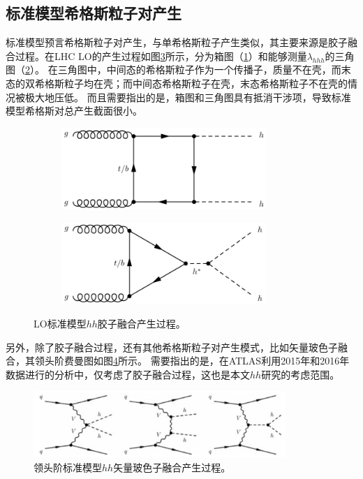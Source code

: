 \subsection{标准模型希格斯粒子对产生}
标准模型预言希格斯粒子对产生，与单希格斯粒子产生类似，其主要来源是胶子融合过程。在LHC LO的产生过程如图\ref{fig:diagram_SMhh_ggF}所示，分为箱图（\ref{fig:diagram_SMhh_box}）和能够测量$\lambda_{hhh}$的三角图（\ref{fig:diagram_SMhh_triangle}）。
在三角图中，中间态的希格斯粒子作为一个传播子，质量不在壳，而末态的双希格斯粒子均在壳；而中间态希格斯粒子在壳，末态希格斯粒子不在壳的情况被极大地压低\cite{Patrignani:2016xqp}。
而且需要指出的是，箱图和三角图具有抵消干涉项，导致标准模型希格斯对总产生截面很小。
\begin{figure}[h]
\centering
 \begin{subfigure}[b]{0.45\textwidth}
  \includegraphics[width=0.85\textwidth]{fig/SMhh_box.png}
  \caption{}
  \label{fig:diagram_SMhh_box}
 \end{subfigure}
 \begin{subfigure}[b]{0.45\textwidth}
  \includegraphics[width=0.85\textwidth]{fig/SMhh_triangle.png}
  \caption{}
  \label{fig:diagram_SMhh_triangle}
 \end{subfigure}
\caption{LO标准模型$hh$胶子融合产生过程。}
\label{fig:diagram_SMhh_ggF}
\end{figure}

另外，除了胶子融合过程，还有其他希格斯粒子对产生模式，比如矢量玻色子融合，其领头阶费曼图如图\ref{fig:diagram_SMhh_VBF}所示。
需要指出的是，在ATLAS利用2015年和2016年数据进行的分析中，仅考虑了胶子融合过程，这也是本文$hh$研究的考虑范围。
\begin{figure}[h]
\centering
  \includegraphics[width=0.85\textwidth]{fig/SMhh_VBF.png}
\caption{领头阶标准模型$hh$矢量玻色子融合产生过程。}
\label{fig:diagram_SMhh_VBF}
\end{figure}

